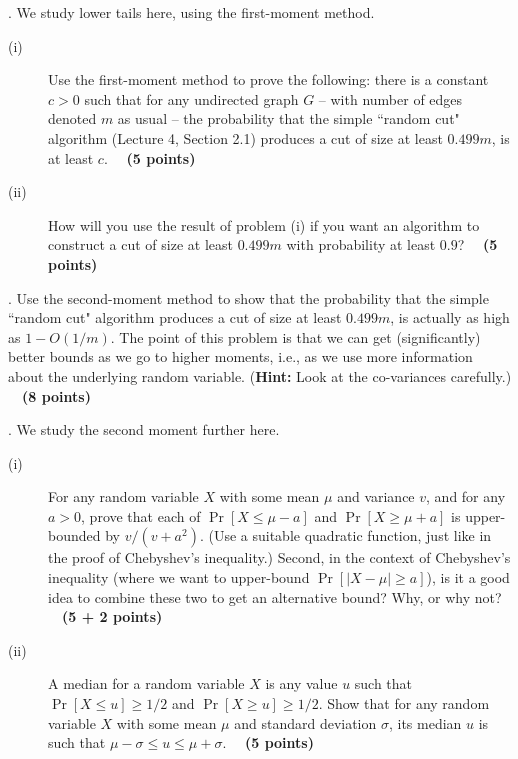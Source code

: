 \documentclass{article}[11pt]
\begin{document}
\medskip \smallskip {}. 
We study lower tails here, using the first-moment method. 
\begin{description}
\item[(i)] Use the first-moment method to prove the following: there is a constant $c > 0$ such that for any undirected graph $G$ -- with number of edges denoted $m$ as usual -- the probability that the simple ``random cut" algorithm (Lecture 4, Section 2.1) produces a cut of size at least $0.499 m$, is at least $c$. 
~~\textbf{(5 points)} 
\item[(ii)] How will you use the result of problem (i) if you want an algorithm to construct a cut of size at least $0.499 m$ with probability at least $0.9$? 
~~\textbf{(5 points)} 
\end{description}

\medskip {}. 
Use the second-moment method to show that the probability 
that the simple ``random cut" algorithm produces a cut of size at least $0.499 m$,
is actually as high as $1 - O(1/m)$. The point of this
problem is that we can get (significantly) better bounds as we go to higher moments, i.e., as we use
more information about the underlying random variable. (\textbf{Hint:} Look at the co-variances 
carefully.) 
~~\textbf{(8 points)} 

\medskip {}. 
We study the second moment further here. 
\begin{description}
\item[(i)] For any random variable $X$ with some mean $\mu$ and variance $v$, and for any $a > 0$, prove that each of
$\Pr[X \leq \mu - a]$ and $\Pr[X \geq \mu + a]$ is upper-bounded by $v/(v + a^2)$. (Use a suitable quadratic function, just like in the proof of Chebyshev's inequality.) Second, in the context of 
Chebyshev's inequality (where we want to upper-bound $\Pr[| X - \mu | \geq a]$), is it a good idea to
 combine these two to get an alternative bound? Why, or why not? 
 ~~\textbf{(5 + 2 points)} 
\item[(ii)] A median for a random variable $X$ is any value $u$ such that $\Pr[X \leq u] \geq 1/2$ and $\Pr[X \geq u] \geq 1/2$. 
Show that for any random variable $X$ with some mean $\mu$ and standard deviation $\sigma$, its median $u$ is such that $\mu - \sigma \leq u \leq \mu + \sigma$. 
~~\textbf{(5 points)} 
\end{description}
\end{document}
